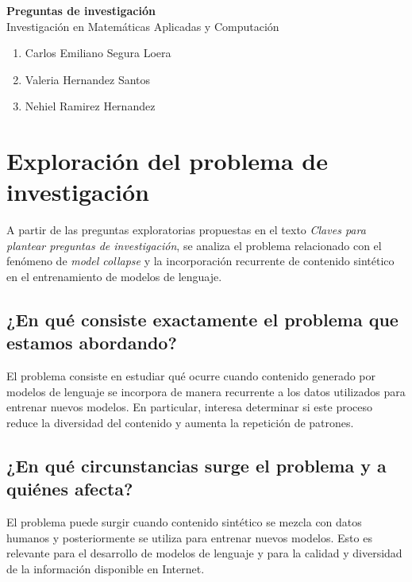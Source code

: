 \documentclass[12pt]{article}
\begin{document}
\begin{center}
    {\Large \textbf{Preguntas de investigación}}\\[0.5cm]
    {\large Investigación en Matemáticas Aplicadas y Computación}

    \begin{enumerate}
        \item Carlos Emiliano Segura Loera
        \item Valeria Hernandez Santos
        \item Nehiel Ramirez Hernandez
    
    \end{enumerate}
\end{center}

\vspace{0.5cm}

\section{Exploración del problema de investigación}

A partir de las preguntas exploratorias propuestas en el texto
\textit{Claves para plantear preguntas de investigación}, se analiza
el problema relacionado con el fenómeno de \textit{model collapse} y
la incorporación recurrente de contenido sintético en el entrenamiento
de modelos de lenguaje.

\subsection{¿En qué consiste exactamente el problema que estamos abordando?}

El problema consiste en estudiar qué ocurre cuando contenido generado
por modelos de lenguaje se incorpora de manera recurrente a los datos
utilizados para entrenar nuevos modelos. En particular, interesa
determinar si este proceso reduce la diversidad del contenido y aumenta
la repetición de patrones.

\subsection{¿En qué circunstancias surge el problema y a quiénes afecta?}

El problema puede surgir cuando contenido sintético se mezcla con datos
humanos y posteriormente se utiliza para entrenar nuevos modelos. Esto
es relevante para el desarrollo de modelos de lenguaje y para la calidad
y diversidad de la información disponible en Internet.
\end{document}

